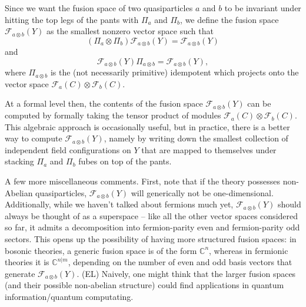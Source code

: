 \documentclass[12pt,a4paper]{article}
\newcommand{\tp}{\otimes}
\newcommand{\cc}{\mathbb{C}}
\newcommand\be            {\begin{equation}}
\newcommand\ee            {\end{equation}}
\newcommand{\fld}{\mathcal{F}}
\newcommand{\ethan}[1]{{\color{amethyst}\footnotesize{(EL) #1}}}
\begin{document}
Since we want the fusion space of two quasiparticles $a$ and $b$ to be invariant under hitting the top legs of the pants with $\Pi_a$ and $\Pi_b$, we define the fusion space $\fld_{a\tp b}(Y)$ as the smallest nonzero vector space such that 
\be (\Pi_a\tp \Pi_b)\fld_{a\tp b}(Y) = \fld_{a\tp b}(Y)\ee
and 
\be \fld_{a\tp b}(Y)\Pi_{a\tp b}= \fld_{a\tp b}(Y),\ee
where $\Pi_{a\tp b}$ is the (not necessarily primitive) idempotent which projects onto the vector space $\fld_a(C)\tp \fld_b(C)$. 

At a formal level then, the contents of the fusion space $\fld_{a\tp b}(Y)$ can be computed by formally taking the tensor product of modules $\fld_a(C)\tp \fld_b(C)$. This algebraic approach is occasionally useful, but in practice, there is a better way to compute $\fld_{a\tp b}(Y)$, namely by writing down the smallest collection of independent field configurations on $Y$ that are mapped to themselves under stacking $\Pi_a$ and $\Pi_b$ fubes on top of the pants. 

A few more miscellaneous comments. First, note that if the theory possesses non-Abelian quasiparticles, $\fld_{a\tp b}(Y)$ will generically not be one-dimensional. Additionally, while we haven't talked about fermions much yet, $\fld_{a\tp b}(Y)$ should always be thought of as a superspace -- like all the other vector spaces considered so far, it admits a decomposition into fermion-parity even and fermion-parity odd sectors. This opens up the possibility of having more structured fusion spaces: in bosonic theories, a generic fusion space is of the form $\cc^n$, whereas in fermionic theories it is $\cc^{n|m}$, depending on the number of even and odd basis vectors that generate $\fld_{a\tp b}(Y)$. \ethan{Naively, one might think that the larger fusion spaces (and their possible non-abelian structure) could find applications in quantum information/quantum computating. }
\end{document}

